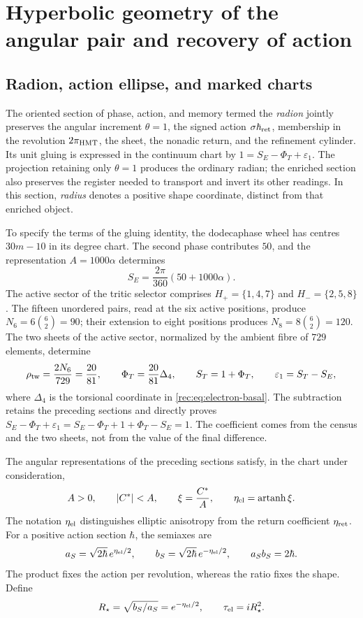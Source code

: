 \section{Hyperbolic geometry of the angular pair and recovery of action}
\label{rec:radial}

\subsection{Radion, action ellipse, and marked charts}

The oriented section of phase, action, and memory termed the \emph{radion} jointly preserves the angular increment \(\theta=1\), the signed action \(\sigma\hbar_{\rm ret}\), membership in the revolution \(2\pi_{\mathrm{HMT}}\), the sheet, the nonadic return, and the refinement cylinder. Its unit gluing is expressed in the continuum chart by \(1=S_E-\Phi_T+\varepsilon_1\). The projection retaining only \(\theta=1\) produces the ordinary radian; the enriched section also preserves the register needed to transport and invert its other readings. In this section, \emph{radius} denotes a positive shape coordinate, distinct from that enriched object.

To specify the terms of the gluing identity, the dodecaphase wheel has centres \(30m-10\) in its degree chart. The second phase contributes \(50\), and the representation \(A=1000\alpha\) determines
\[
 S_E=\frac{2\pi}{360}(50+1000\alpha).
\]
The active sector of the tritic selector comprises \(H_+=\{1,4,7\}\) and \(H_-=\{2,5,8\}\). The fifteen unordered pairs, read at the six active positions, produce \(N_6=6\binom62=90\); their extension to eight positions produces \(N_8=8\binom62=120\). The two sheets of the active sector, normalized by the ambient fibre of \(729\) elements, determine
\[
 \rho_{\rm tw}=\frac{2N_6}{729}=\frac{20}{81},\qquad
 \Phi_T=\frac{20}{81}\Delta_4,\qquad
 S_T=1+\Phi_T,\qquad \varepsilon_1=S_T-S_E,
\]
where \(\Delta_4\) is the torsional coordinate in \eqref{rec:eq:electron-basal}. The subtraction retains the preceding sections and directly proves
\(S_E-\Phi_T+\varepsilon_1=S_E-\Phi_T+1+\Phi_T-S_E=1\).
The coefficient comes from the census and the two sheets, not from the value of the final difference.

The angular representations of the preceding sections satisfy, in the chart under consideration,
\[
 A>0,\qquad |C^*|<A,\qquad
 \xi=\frac{C^*}{A},\qquad \eta_{\rm el}=\operatorname{artanh}\xi.
\]
The notation \(\eta_{\rm el}\) distinguishes elliptic anisotropy from the return coefficient \(\eta_{\rm ret}\). For a positive action section \(\hbar\), the semiaxes are
\begin{equation}
 a_S=\sqrt{2\hbar}\,e^{\eta_{\rm el}/2},\qquad
 b_S=\sqrt{2\hbar}\,e^{-\eta_{\rm el}/2},\qquad a_Sb_S=2\hbar.
 \label{rec:eq:elipse}
\end{equation}
The product fixes the action per revolution, whereas the ratio fixes the shape. Define
\[
 R_\star=\sqrt{b_S/a_S}=e^{-\eta_{\rm el}/2},\qquad
 \tau_{\rm el}=iR_\star^2.
\]

